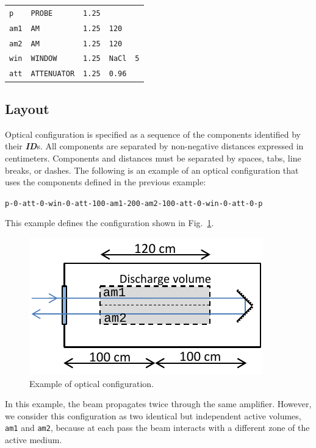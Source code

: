 \documentclass{report}
\begin{document}
\bigskip
\begin{tabular}{lllll}
\texttt{p}   & \texttt{PROBE}      & \texttt{1.25} &               &           \\
\texttt{am1} & \texttt{AM}         & \texttt{1.25} & \texttt{120}  &           \\
\texttt{am2} & \texttt{AM}         & \texttt{1.25} & \texttt{120}  &           \\
\texttt{win} & \texttt{WINDOW}     & \texttt{1.25} & \texttt{NaCl} & \texttt{5}\\
\texttt{att} & \texttt{ATTENUATOR} & \texttt{1.25} & \texttt{0.96} &
\end{tabular}

\subsection{Layout}
Optical configuration is specified as a sequence of the components identified by their \textit{\textbf{ID}}s. All components are separated by non-negative distances expressed in centimeters. Components and distances must be separated by spaces, tabs, line breaks, or dashes. The following is an example of an optical configuration that uses the components defined in the previous example:

\bigskip
\texttt{p-0-att-0-win-0-att-100-am1-200-am2-100-att-0-win-0-att-0-p }
\bigskip

This example defines the configuration shown in Fig.~\ref{fig:optical-configuration-1}.

\begin{figure}[ht]
\centering
\includegraphics{images/optical-configuration-1}
\caption{Example of optical configuration.}\label{fig:optical-configuration-1}
\end{figure}

In this example, the beam propagates twice through the same amplifier. However, we consider this configuration as two identical but independent active volumes, \texttt{am1} and \texttt{am2}, because at each pass the beam interacts with a different zone of the active medium.
\end{document}
